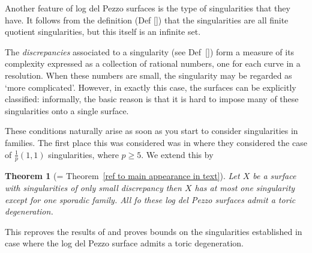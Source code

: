 \documentclass[12pt,a4paper]{book}      %
\newtheorem{thm}{Theorem}[section]
\begin{document}
Another feature of log del Pezzo surfaces is the type of singularities
that they have. It follows from the definition (Def \ref{}) that the singularities
are all finite quotient singularities, but this itself is an infinite set.

The {\em discrepancies} associated to a singularity (see Def~\ref{}) form a measure of
its complexity expressed as a collection of rational numbers, one for each curve in a resolution. 
When these numbers are small, the singularity may be regarded as `more complicated'.
However, in exactly this case, the surfaces can be explicitly classified: informally,
the basic reason is that it is hard to impose many of these singularities onto a single surface.

These conditions naturally arise as soon as you start to consider singularities in families. The first place this was considered was in \cite{CP} where they considered the case of $\frac{1}{p}(1,1)$ singularities, where $p \geq 5$. We extend this by


\begin{thm}[= Theorem~\ref{ref to main appearance in text}]
Let $X$ be a surface with singularities of only small discrepancy then $X$ has at most one singularity except for one sporadic family. All fo these log del Pezzo surfaces admit a toric degeneration.
\end{thm}

This reproves the results of \cite{CP} and proves bounds on the singularities established in \cite{CH} case where the log del Pezzo surface admits a toric degeneration.
\end{document}
